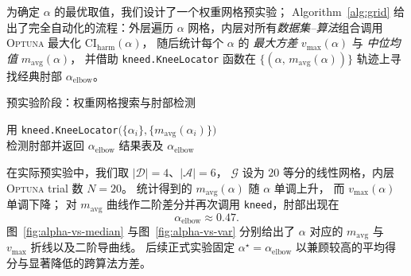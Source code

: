 \documentclass[10pt]{article} %
\numberwithin{equation}{section}
\begin{document}
\textcolor[rgb]{0.00,0.07,1.00}{为确定 $\alpha$ 的最优取值，我们设计了一个权重网格预实验；
Algorithm \ref{alg:grid} 给出了完全自动化的流程：外层遍历
$\alpha$ 网格，内层对所有\emph{数据集--算法}组合调用
\textsc{Optuna} 最大化 $\text{CI}_{\mathrm{harm}}(\alpha)$，
随后统计每个 $\alpha$ 的
\emph{最大方差} $v_{\max}(\alpha)$ 与 \emph{中位均值} $m_{\mathrm{avg}}(\alpha)$，
并借助 \texttt{kneed.KneeLocator} 函数在
$\bigl\{(\alpha,\,m_{\mathrm{avg}}(\alpha))\bigr\}$ 轨迹上寻找经典肘部
$\alpha_{\text{elbow}}$。}

\begin{algorithm}[t]
\small
\setlength{\tabcolsep}{6pt}
\renewcommand{\arraystretch}{1.2}
\caption{\textcolor[rgb]{0.00,0.07,1.00}{预实验阶段：权重网格搜索与肘部检测}}
\label{alg:grid}

用 \texttt{kneed.KneeLocator}$\bigl(\{\alpha_i\},\{m_{\mathrm{avg}}(\alpha_i)\}\bigr)$\\
检测肘部并返回 $\alpha_{\text{elbow}}$\;
\KwRet 结果表及 $\alpha_{\text{elbow}}$
\end{algorithm}

\textcolor[rgb]{0.00,0.07,1.00}{在实际预实验中，我们取 $|\mathcal{D}|=4$、$|\mathcal{A}|=6$，
$\mathcal{G}$ 设为 $20$ 等分的线性网格，内层
\textsc{Optuna} trial 数 $N=20$。
统计得到的
$m_{\mathrm{avg}}(\alpha)$ 随 $\alpha$ 单调上升，
而 $v_{\max}(\alpha)$ 单调下降；
对 $m_{\mathrm{avg}}$ 曲线作二阶差分并再次调用
\texttt{kneed}，肘部出现在
\[
\boxed{\alpha_{\text{elbow}}\approx0.47}.
\]
图~\ref{fig:alpha-vs-median} 与图~\ref{fig:alpha-vs-var}
分别给出了 $\alpha$ 对应的 $m_{\mathrm{avg}}$ 与 $v_{\max}$ 折线以及二阶导曲线。
后续正式实验固定
$\alpha^\star=\alpha_{\text{elbow}}$
以兼顾较高的平均得分与显著降低的跨算法方差。}
\end{document}
